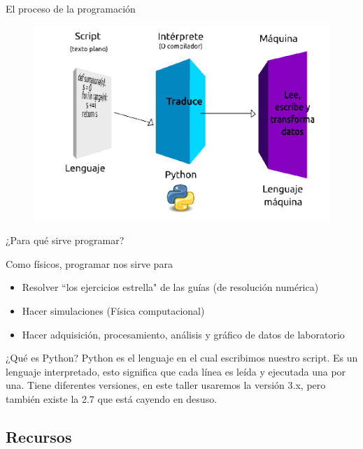 \documentclass{beamer}
\begin{document}
\begin{frame}{El proceso de la programación}
        \begin{figure}
    \centering
    \includegraphics[width=\textwidth]{fig/programar.png}
    \end{figure}
\end{frame}

\begin{frame}{¿Para qué sirve programar?}

Como físicos, programar nos sirve para
    \begin{itemize}
        \item Resolver ``los ejercicios estrella" de las guías (de resolución
numérica)
\item Hacer simulaciones (Física computacional)
\item Hacer adquisición, procesamiento, análisis y gráfico de datos de
laboratorio
    \end{itemize}
\end{frame}

\begin{frame}{¿Qué es Python?}
Python es el lenguaje en el cual escribimos nuestro script. Es un
lenguaje interpretado, esto significa que cada línea es leída y
ejecutada una por una. Tiene diferentes versiones, en este taller usaremos la
versión 3.x, pero también existe la 2.7 que está cayendo en desuso.
    
\end{frame}


\subsection{Recursos}
\end{document}
